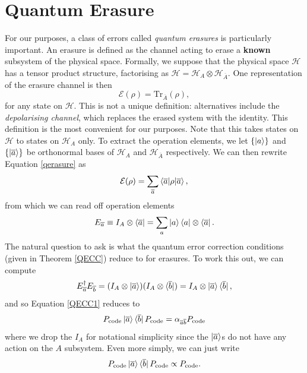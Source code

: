 \documentclass[12pt,a4paper]{report}
\numberwithin{equation}{section}
\newcommand{\ketbra}[2]{\ket{#1}\bra{#2}}
\newcommand{\ketbras}[1]{\ketbra{#1}{#1}}
\newcommand{\Pc}{P_{\text{code}}}
\newcommand{\ol}[1]{\overline{#1}}
\theoremstyle{definition}
\theoremstyle{theorem}
\theoremstyle{theorem}
\theoremstyle{example}
\theoremstyle{definition}
\begin{document}
\section{Quantum Erasure}
For our purposes, a class of errors called \textit{quantum erasures} is particularly important. An erasure is defined as the channel acting to erase a \textbf{known} subsystem of the physical space. Formally, we suppose that the physical space $\mathcal{H}$ has a tensor product structure, factorising as $\mathcal{H}=\mathcal{H}_{A}\otimes\mathcal{H}_{\ol{A}}$. One representation of the erasure channel is then 
\begin{equation}\label{qerasure}
	\mathcal{E}(\rho)=\text{Tr}_{\ol{A}}(\rho),
\end{equation} 
for any state on $\mathcal{H}$. This is not a unique definition: alternatives include the \textit{depolarising channel}, which replaces the erased system with the identity. This definition is the most convenient for our purposes. Note that this takes states on $\mathcal{H}$ to states on $\mathcal{H}_{A}$ only. To extract the operation elements, we let $\{\ket{a}\}$ and $\{\ket{\ol{a}}\}$ be orthonormal bases of $\mathcal{H}_{A}$ and $\mathcal{H}_{\ol{A}}$ respectively. We can then rewrite Equation \ref{qerasure} as
\begin{equation}
	\mathcal{E}(\rho)=\sum_{\ol{a}}\braket{\ol{a}|\rho|\ol{a}},
\end{equation}
from which we can read off operation elements
\begin{equation}
	E_{\ol{a}}\equiv I_{A}\otimes\bra{\ol{a}}=\sum_{a}\ketbras{a}\otimes\bra{\ol{a}}.
\end{equation}
The natural question to ask is what the quantum error correction conditions (given in Theorem \ref{QECC}) reduce to for erasures. To work this out, we can compute
\begin{equation}
	E_{\ol{a}}^{\dagger}E_{\ol{b}}=(I_{A}\otimes\ket{\ol{a}})(I_{A}\otimes\bra{\ol{b}})=I_{A}\otimes\ketbra{\ol{a}}{\ol{b}},
\end{equation}
and so Equation \ref{QECC1} reduces to
\begin{equation}\label{Qerc}
	\Pc\ketbra{\ol{a}}{\ol{b}}\Pc=\alpha_{\ol{a}\ol{b}}\Pc
\end{equation}
where we drop the $I_{A}$ for notational simplicity since the $\ket{\ol{a}}$s do not have any action on the $A$ subsystem. Even more simply, we can just write
\begin{equation}
	\Pc\ketbra{\ol{a}}{\ol{b}}\Pc\propto\Pc.
\end{equation}
\end{document}
